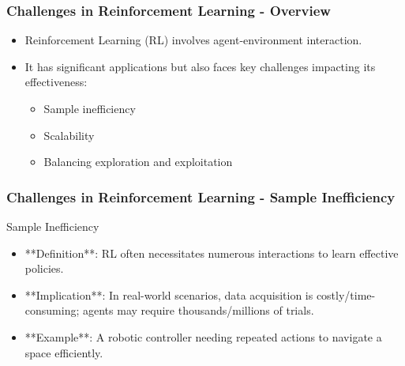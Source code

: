\documentclass[aspectratio=169]{beamer}
\begin{document}
\begin{frame}[fragile]
    \frametitle{Challenges in Reinforcement Learning - Overview}
    \begin{itemize}
        \item Reinforcement Learning (RL) involves agent-environment interaction.
        \item It has significant applications but also faces key challenges impacting its effectiveness:
        \begin{itemize}
            \item Sample inefficiency
            \item Scalability
            \item Balancing exploration and exploitation
        \end{itemize}
    \end{itemize}
\end{frame}

\begin{frame}[fragile]
    \frametitle{Challenges in Reinforcement Learning - Sample Inefficiency}
    \begin{block}{Sample Inefficiency}
        \begin{itemize}
            \item **Definition**: RL often necessitates numerous interactions to learn effective policies.
            \item **Implication**: In real-world scenarios, data acquisition is costly/time-consuming; agents may require thousands/millions of trials.
            \item **Example**: A robotic controller needing repeated actions to navigate a space efficiently.
        \end{itemize}
    \end{block}
\end{frame}
\end{document}
